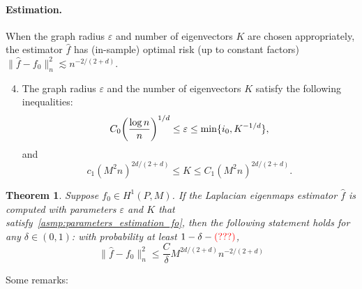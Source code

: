 \documentclass{article}
\newcommand{\1}{\mathbf{1}}
\newcommand{\wh}[1]{\widehat{#1}}
\theoremstyle{alden}
\theoremstyle{aldenthm}
\newtheorem{theorem}{Theorem}
\theoremstyle{definition}
\theoremstyle{remark}
\begin{document}
\paragraph{Estimation.} When the graph radius $\varepsilon$ and number of eigenvectors $K$ are chosen appropriately, the estimator $\wh{f}$ has (in-sample) optimal risk (up to constant factors) $\|\wh{f} - f_0\|_n^2 \lesssim n^{-2/(2 + d)}$. 
\begin{enumerate}[label=(A\arabic*)]
	\setcounter{enumi}{3}
	\item 
	\label{asmp:parameters_estimation_fo} 
	The graph radius $\varepsilon$ and the number of eigenvectors $K$ satisfy the following inequalities:
	\begin{equation}\\
	\label{eqn:radius_fo} 
	C_0 \biggl(\frac{\log n}{n}\biggr)^{1/d} \leq \varepsilon \leq \min\{i_0,K^{-1/d}\},
	\end{equation}
	and 
	\begin{equation}
	\label{eqn:eigenvector_estimation_fo} 
	c_1 (M^2 n)^{2d/(2 + d)}\leq K \leq C_1 (M^2 n)^{2d/(2 + d)}.
	\end{equation}
\end{enumerate}
\begin{theorem}
	\label{thm:laplacian_eigenmaps_estimation_fo}
	Suppose $f_0 \in H^1(P,M)$. If the Laplacian eigenmaps estimator $\wh{f}$ is computed with parameters $\varepsilon$ and $K$ that satisfy~\ref{asmp:parameters_estimation_fo}, then the following statement holds for any $\delta \in (0,1)$: with probability at least $1 - \delta - \textcolor{red}{(???)}$,
	\begin{equation}
	\label{eqn:laplacian_eigenmaps_estimation_fo}
	\|\wh{f} - f_0\|_n^2 \leq \frac{C}{\delta}M^{2d/(2 + d)}n^{-2/(2 + d)}
	\end{equation}
\end{theorem}
Some remarks:
\end{document}
